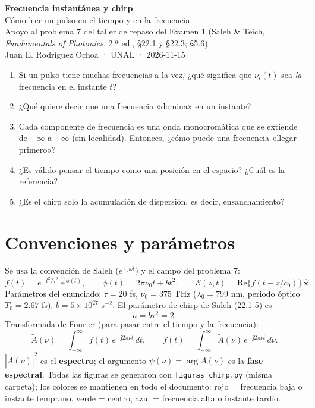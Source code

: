 \documentclass[11pt]{article}
\newcommand{\jj}{\mathrm{j}}
\begin{document}
\begin{center}
{\LARGE\bfseries\color{tema} Frecuencia instantánea y chirp}\\[1ex]
{\large Cómo leer un pulso en el tiempo y en la frecuencia}\\[1ex]
{\small Apoyo al problema 7 del taller de repaso del Examen 1 (Saleh \& Teich, \emph{Fundamentals of Photonics}, 2.ª ed., §22.1 y §22.3; §5.6)\\
Juan E. Rodríguez Ochoa · UNAL · 2026-11-15}
\end{center}

\begin{idea}[title={Las dudas que motivan este documento}]
\begin{enumerate}[leftmargin=1.6em]
\item Si un pulso tiene muchas frecuencias a la vez, ¿qué significa que $\nu_i(t)$ sea \emph{la} frecuencia en el instante $t$?
\item ¿Qué quiere decir que una frecuencia «domina» en un instante?
\item Cada componente de frecuencia es una onda monocromática que se extiende de $-\infty$ a $+\infty$ (sin localidad). Entonces, ¿cómo puede una frecuencia «llegar primero»?
\item ¿Es válido pensar el tiempo como una posición en el espacio? ¿Cuál es la referencia?
\item ¿Es el chirp solo la acumulación de dispersión, es decir, ensanchamiento?
\end{enumerate}
\end{idea}

\section*{Convenciones y parámetros}
Se usa la convención de Saleh ($e^{+\jj\omega t}$) y el campo del problema 7:
\[
f(t)=e^{-t^2/\tau^2}\,e^{\jj\phi(t)},\qquad \phi(t)=2\pi\nu_0t+bt^2,\qquad
\mathcal E(z,t)=\mathrm{Re}\{f(t-z/c_0)\}\,\hat{\mathbf x}.
\]
Parámetros del enunciado: $\tau=20$ fs, $\nu_0=375$ THz ($\lambda_0=799$ nm, periodo óptico $T_0=2.67$ fs), $b=5\times10^{27}$ s$^{-2}$. El parámetro de chirp de Saleh (22.1-5) es
\[
a=b\tau^2=2 .
\]
Transformada de Fourier (para pasar entre el tiempo y la frecuencia):
\[
\tilde A(\nu)=\int_{-\infty}^{\infty}f(t)\,e^{-\jj2\pi\nu t}\,dt,\qquad f(t)=\int_{-\infty}^{\infty}\tilde A(\nu)\,e^{+\jj2\pi\nu t}\,d\nu .
\]
$|\tilde A(\nu)|^2$ es el \textbf{espectro}; el argumento $\psi(\nu)=\arg\tilde A(\nu)$ es la \textbf{fase espectral}. Todas las figuras se generaron con \texttt{figuras\_chirp.py} (misma carpeta); los colores se mantienen en todo el documento: \textcolor[RGB]{214,69,69}{rojo} = frecuencia baja o instante temprano, \textcolor[RGB]{27,175,122}{verde} = centro, \textcolor[RGB]{42,120,214}{azul} = frecuencia alta o instante tardío.
\end{document}
